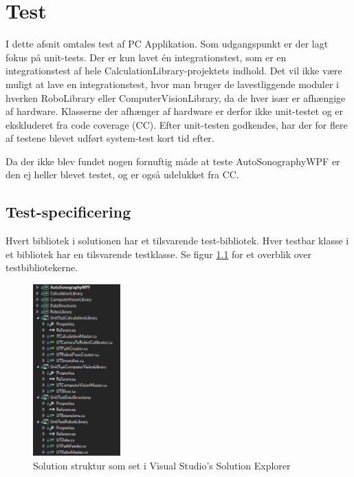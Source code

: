 \chapter{Test}\label{Test}
I dette afsnit omtales test af PC Applikation. Som udgangspunkt er der lagt fokus på unit-tests. Der er kun lavet én integrationstest, som er en integrationstest af hele CalculationLibrary-projektets indhold. Det vil ikke være muligt at lave en integrationstest, hvor man bruger de lavestliggende moduler i hverken RoboLibrary eller ComputerVisionLibrary, da de hver især er afhængige af hardware. Klasserne der afhænger af hardware er derfor ikke unit-testet og er ekskluderet fra code coverage (CC). 
Efter unit-testen godkendes, har der for flere af testene blevet udført system-test kort tid efter.

Da der ikke blev fundet nogen fornuftig måde at teste AutoSonographyWPF er den ej heller blevet testet, og er også udelukket fra CC.
\section{Test-specificering}
Hvert bibliotek i solutionen har et tilsvarende test-bibliotek. Hver testbar klasse i et bibliotek har en tilsvarende testklasse. Se figur \ref{SolutionStructure} for et overblik over testbibliotekerne.

\begin{figure}[H]
    \centering
    \includegraphics[width=0.3\textwidth]{figurer/d/Test/solution_overview}
    \caption{Solution struktur som set i Visual Studio's Solution Explorer}
    \label{SolutionStructure}
\end{figure}

\newpage
